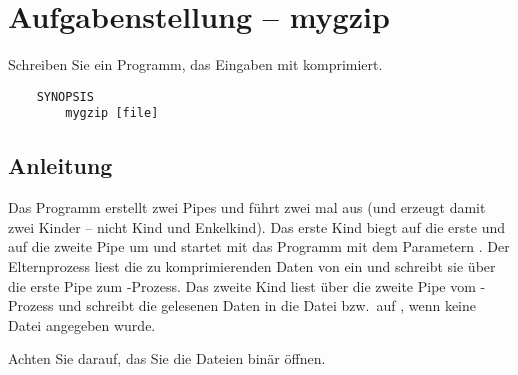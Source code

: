 




\section*{Aufgabenstellung -- mygzip}

Schreiben Sie ein Programm, das Eingaben mit  komprimiert.

\begin{verbatim}
    SYNOPSIS
        mygzip [file]
\end{verbatim}

\subsection*{Anleitung}

Das Programm erstellt zwei Pipes und führt zwei mal  aus (und
erzeugt damit zwei Kinder -- nicht Kind und Enkelkind). Das erste Kind biegt
 auf die erste und  auf die zweite Pipe um
und startet mit  das Programm  mit dem
Parametern . Der Elternprozess liest die zu komprimierenden Daten von
 ein und schreibt sie über die erste Pipe zum
-Prozess. Das zweite Kind liest über die zweite Pipe vom
-Prozess und schreibt die gelesenen Daten in die Datei
 bzw.\ auf , wenn keine Datei angegeben
wurde.

Achten Sie darauf, das Sie die Dateien binär öffnen.

\osueguidelinestwo


